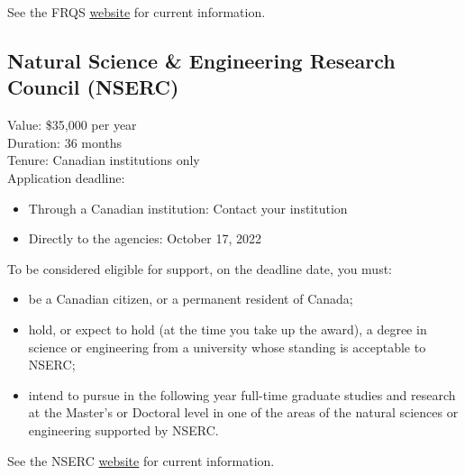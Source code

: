 \documentclass[
  openany]{book}
\providecommand{\tightlist}{%
  \setlength{\itemsep}{0pt}\setlength{\parskip}{0pt}}
\begin{document}
See the FRQS \href{https://frq.gouv.qc.ca/en/program/formation-de-doctorat-2022-2023}{website} for current information.

\hypertarget{natural-science-engineering-research-council-nserc}{%
\subsection{Natural Science \& Engineering Research Council (NSERC)}\label{natural-science-engineering-research-council-nserc}}

Value: \$35,000 per year\\
Duration: 36 months\\
Tenure: Canadian institutions only\\
Application deadline:

\begin{itemize}
\tightlist
\item
  Through a Canadian institution: Contact your institution
\item
  Directly to the agencies: October 17, 2022
\end{itemize}

To be considered eligible for support, on the deadline date, you must:

\begin{itemize}
\tightlist
\item
  be a Canadian citizen, or a permanent resident of Canada;
\item
  hold, or expect to hold (at the time you take up the award), a degree in science or engineering from a university whose standing is acceptable to NSERC;
\item
  intend to pursue in the following year full-time graduate studies and research at the Master's or Doctoral level in one of the areas of the natural sciences or engineering supported by NSERC.
\end{itemize}

See the NSERC \href{https://www.nserc-crsng.gc.ca/OnlineServices-ServicesEnLigne/instructions/201/pgs-pdf_eng.asp}{website} for current information.

  
\end{document}
